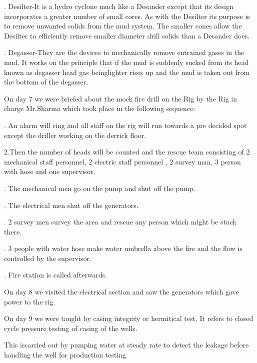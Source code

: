 \vspace{1em}

. Desilter-It is a hydro cyclone much like a Desander except that its
design incorporates a greater number of small cores. As with the
Desilter its purpose is to remove unwanted solids from the mud
system. The smaller cones allow the Desilter to efficiently remove
smaller diameter drill solids than a Desander does.

\vspace{1em}

. Degasser-They are the devices to mechanically remove entrained
gases in the mud. It works on the principle that if the mud is
suddenly sucked from its head known as degasser head gas beinglighter rises
 up and the mud is taken out from the bottom of the
degasser.

\vspace{1em}


On day 7 we were briefed about the mock fire drill on the Rig by the
Rig in charge Mr.Sharma which took place in the following sequence:

\vspace{0.5em}

. An alarm will ring and all staff on the rig will run towards a pre
decided spot except the driller working on the derrick floor.

\noindent 2.Then the number of heads will be counted and the rescue team
 consisting of 2 mechanical staff personnel, 2 electric staff
 personnel , 2 survey man, 3 person with hose and one
 supervisor.

. The mechanical men go on the pump and shut off the pump.

. The electrical men shut off the generators.

. 2 survey men survey the area and rescue any person which
   might be stuck there.

. 3 people with water hose make water umbrella above the fire
and the flow is controlled by the supervisor.

. Fire station is called afterwards.


On day 8 we visited the electrical section and saw the generators
which gave power to the rig.

On day 9 we were taught by casing integrity or hermitical test. It
refers to closed cycle pressure testing of casing of the wells. 

This iscarried out by pumping water at steady rate to detect the leakage
before handling the well for production testing.
 
